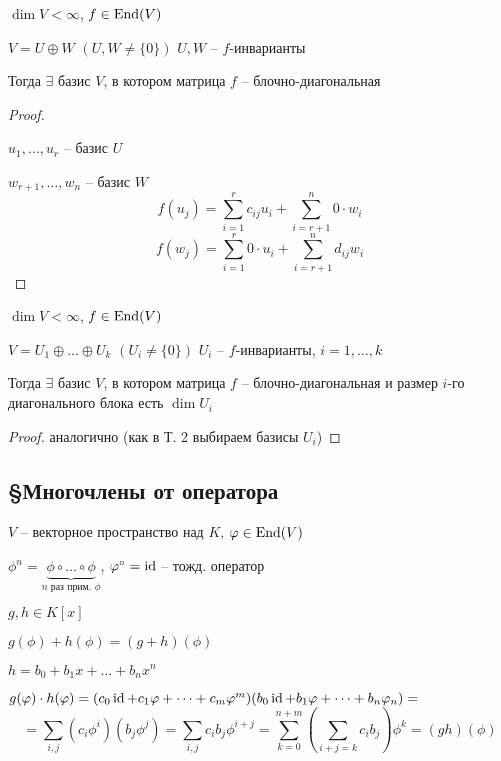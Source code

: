     \begin{theorem}
        $\dim V < \infty$, $f \in \operatorname{End}(V)$
        \par $V = U \oplus W$ \quad $(U, W \not= \{0\})$ \quad $U, W$ -- $f$-инварианты
        \par Тогда $\exists$ базис $V$, в котором матрица $f$ -- блочно-диагональная
    \end{theorem}
    
    \begin{proof}
        $ $
        \par $u_1, \dots, u_r$ -- базис $U$
        \par $w_{r+1}, \dots, w_n$ -- базис $W$
        \[
            f(u_j) = \sum_{i=1}^r c_{ij} u_i + \sum_{i=r+1}^n 0 \cdot w_i  
        \]
        \[
            f(w_j) = \sum_{i=1}^r 0 \cdot u_i + \sum_{i=r+1}^n d_{ij} w_i  
        \]
    \end{proof}

    \begin{theorem}
        $\dim V < \infty$, $f \in \operatorname{End}(V)$
        \par $V = U_1 \oplus \dots \oplus U_k$ \quad $(U_i \not= \{0\})$ \quad $U_i$ -- $f$-инварианты, $i = 1, \dots, k$
        \par Тогда $\exists$ базис $V$, в котором матрица $f$ -- блочно-диагональная и размер $i$-го диагонального блока есть $\dim U_i$
    \end{theorem}

    \begin{proof}
        аналогично (как в Т. 2 выбираем базисы $U_i$)
    \end{proof}

    \subsection*{\S Многочлены от оператора}

    \par $V$ -- векторное пространство над $K$, $\varphi \in \operatorname{End}(V)$
    \par $\phi^n = \underbrace{\phi \circ \dots \circ \phi}_{n \text{ раз прим. } \phi}$, $\varphi^\circ = \operatorname{id}$ -- тожд. оператор
    \par $g, h \in K[x]$
    \par $g(\phi) + h(\phi) = (g+h)(\phi)$
    \par $h = b_0 + b_1x + \dots + b_nx^n$
    \par $g(\varphi) \cdot h(\varphi) = (c_0\operatorname{id} + c_1\varphi + \dots + c_m\varphi^m)(b_0\operatorname{id} + b_1\varphi + \dots + b_n\varphi_n) =$
    \[
        = \sum_{i, j} (c_i\phi^i)(b_j\phi^j) = \sum_{i, j} c_ib_j \phi^{i+j} = \sum_{k=0}^{n+m} (\sum_{i + j = k} c_ib_j) \phi^k = (gh)(\phi)    
    \]

